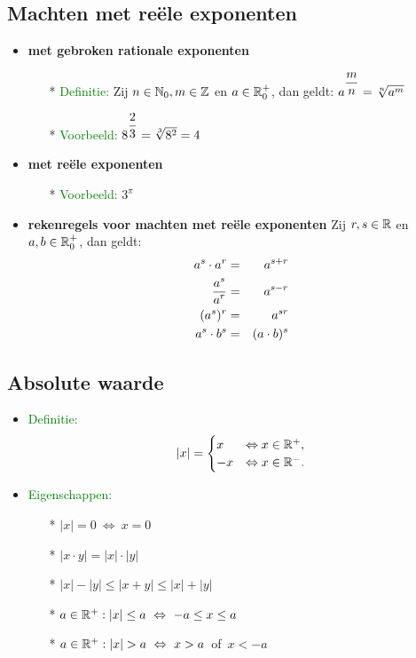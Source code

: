 \subsection{Machten met re\"ele exponenten} \label{machten_reeel}
\hypertarget{machten_reeel}{}
\begin{itemize}%
\item {\bf met gebroken rationale exponenten}
\begin{itemize}%
\item[*] \textcolor{green}{Definitie:} Zij $n \in \mathbb{N}_0, m \in \mathbb{Z}$ en $a \in \mathbb{R}_0^+$, dan geldt: $a^{\displaystyle\frac{\displaystyle m}{\displaystyle n}} = \sqrt[n]{a^m}$
\item[*] \textcolor{green}{Voorbeeld:} $8^{\displaystyle\frac{\displaystyle 2}{\displaystyle 3}}=\sqrt[3]{8^2}=4$
\end{itemize}%
\item {\bf met re\"ele exponenten}
\begin{itemize}%
\item[*] \textcolor{green}{Voorbeeld:} $3^{\pi}$
\end{itemize}%
\item {\bf rekenregels voor machten met re\"ele exponenten}\newline
Zij $r, s \in \mathbb{R}$ en $a, b \in \mathbb{R}_0^+$, dan geldt: \newline
\begin{eqnarray*}
a^s\cdot a^r & = & a^{s+r}\\
\displaystyle\frac{\displaystyle a^s}{\displaystyle a^r} & = & a^{s-r}\\
(a^s)^r & = & a^{sr}\\
a^s\cdot b^s & = & (a\cdot b)^s
\end{eqnarray*}
\end{itemize}%

\subsection{Absolute waarde} \label{absolute_waarde}
\hypertarget{absolute_waarde}{}

\begin{itemize}
\item \textcolor{green}{Definitie:}
  \[
     |x| = \begin{cases}
            x & \Leftrightarrow x \in \mathbb{R}^+,\\
           -x & \Leftrightarrow x \in \mathbb{R}^-.
           \end{cases}
  \]
\item \textcolor{green}{Eigenschappen:}\newline
  \begin{itemize}
  \item[*] $|x|=0\ \Leftrightarrow\ x=0$
  \item[*] $|x\cdot y|=|x|\cdot|y|$
  \item[*] $|x|-|y|\leq |x+y|\leq |x|+|y|$
  \item[*] $a\in \mathbb{R}^+:|x| \leq a \ \Leftrightarrow\ -a\leq x \leq a$
  \item[*] $a\in\R^+:|x|>a \ \Leftrightarrow\ x> a$ \,of\, $x<-a$
  \end{itemize}
\end{itemize}

